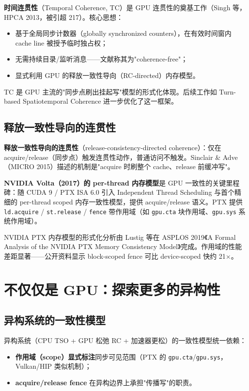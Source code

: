 \textbf{时间连贯性}（Temporal Coherence, TC）是 GPU 连贯性的奠基工作（Singh 等，HPCA 2013，被引超 217）。核心思想：

\begin{itemize}
\item 基于全局同步计数器（globally synchronized counters），在有效时间窗内 cache line 被授予临时独占权；
\item 无需持续目录/监听消息——文献称其为"coherence-free"；
\item 显式利用 GPU 的释放一致性导向（RC-directed）内存模型。
\end{itemize}


TC 是 GPU 主流的"同步点刷出挂起写"模型的形式化体现。后续工作如 Turn-based Spatiotemporal Coherence 进一步优化了这一框架。

\subsection{释放一致性导向的连贯性}

\textbf{释放一致性导向的连贯性}（release-consistency-directed coherence）：仅在 acquire/release（同步点）触发连贯性动作，普通访问不触发。Sinclair \& Adve（MICRO 2015）描述的机制是"acquire 时刷整个 cache、release 前缓冲写"。

\textbf{NVIDIA Volta（2017）的 per-thread 内存模型}是 GPU 一致性的关键里程碑：随 CUDA 9 / PTX ISA 6.0 引入 Independent Thread Scheduling 与首个精细的 per-thread scoped 内存一致性模型，提供 acquire/release 语义。PTX 提供 \texttt{ld.acquire} / \texttt{st.release} / \texttt{fence} 带作用域（如 \texttt{gpu.cta} 块作用域、\texttt{gpu.sys} 系统作用域）。

NVIDIA PTX 内存模型的形式化分析由 Lustig 等在 ASPLOS 2019《A Formal Analysis of the NVIDIA PTX Memory Consistency Model》完成。作用域的性能差距显著——公开资料显示 block-scoped fence 可比 device-scoped 快约 21$\times$。

\section{不仅仅是 GPU：探索更多的异构性}

\subsection{异构系统的一致性模型}

异构系统（CPU TSO + GPU 松弛 RC + 加速器更松）的一致性模型统一依赖：

\begin{itemize}
\item \textbf{作用域（scope）显式标注}同步可见范围（PTX 的 \texttt{gpu.cta}/\texttt{gpu.sys}，Vulkan/HIP 类似机制）；
\item \textbf{acquire/release fence} 在异构边界上承担"传播写"的职责。
\end{itemize}


